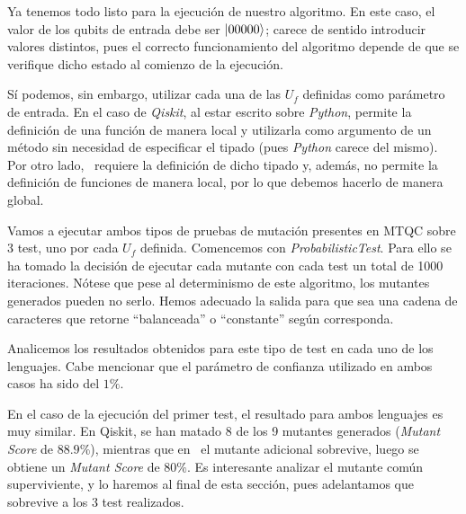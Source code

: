 Ya tenemos todo listo para la ejecución de nuestro algoritmo. En este caso, el valor de los qubits de entrada debe ser $\left|00000\right\rangle$; carece de sentido introducir valores distintos, pues el correcto funcionamiento del algoritmo depende de que se verifique dicho estado al comienzo de la ejecución.

Sí podemos, sin embargo, utilizar cada una de las $U_f$ definidas como parámetro de entrada. En el caso de \textit{Qiskit}, al estar escrito sobre \textit{Python}, permite la definición de una función de manera local y utilizarla como argumento de un método sin necesidad de especificar el tipado (pues \textit{Python} carece del mismo). Por otro lado, \qsh\ requiere la definición de dicho tipado y, además, no permite la definición de funciones de manera local, por lo que debemos hacerlo de manera global.

Vamos a ejecutar ambos tipos de pruebas de mutación presentes en MTQC sobre 3 test, uno por cada $U_f$ definida. Comencemos con \textit{ProbabilisticTest}. Para ello se ha tomado la decisión de ejecutar cada mutante con cada test un total de 1000 iteraciones. Nótese que pese al determinismo de este algoritmo, los mutantes generados pueden no serlo. Hemos adecuado la salida para que sea una cadena de caracteres que retorne ``balanceada'' o ``constante'' según corresponda.

Analicemos los resultados obtenidos para este tipo de test en cada uno de los lenguajes. Cabe mencionar que el parámetro de confianza utilizado en ambos casos ha sido del $1\%$.

En el caso de la ejecución del primer test, el resultado para ambos lenguajes es muy similar. En Qiskit, se han matado 8 de los 9 mutantes generados (\textit{Mutant Score} de $88.9\%$), mientras que en \qsh\ el mutante adicional sobrevive, luego se obtiene un \textit{Mutant Score} de $80\%$. Es interesante analizar el mutante común superviviente, y lo haremos al final de esta sección, pues adelantamos que sobrevive a los 3 test realizados.


